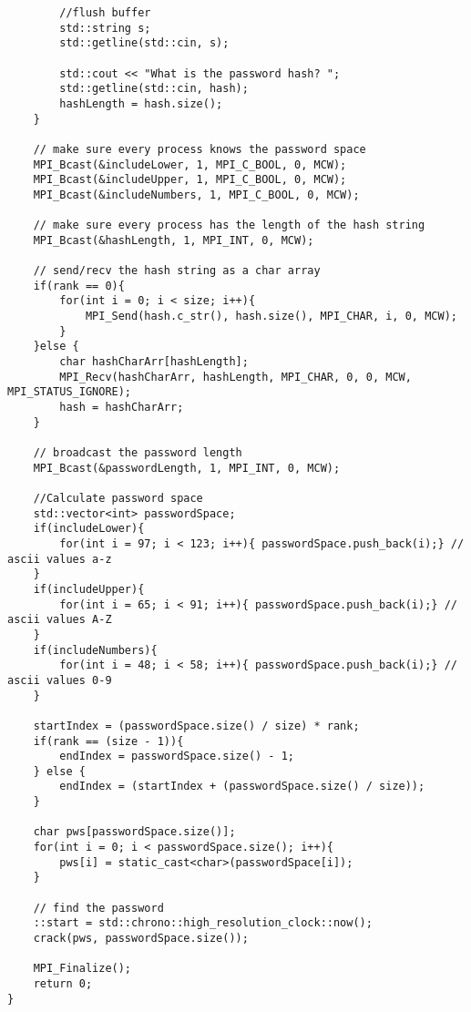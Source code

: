 \documentclass[11pt]{article}
\begin{document}
\begin{verbatim}
        //flush buffer
        std::string s;
        std::getline(std::cin, s);

		std::cout << "What is the password hash? ";
		std::getline(std::cin, hash);
		hashLength = hash.size();
	}

	// make sure every process knows the password space
    MPI_Bcast(&includeLower, 1, MPI_C_BOOL, 0, MCW);
    MPI_Bcast(&includeUpper, 1, MPI_C_BOOL, 0, MCW);
    MPI_Bcast(&includeNumbers, 1, MPI_C_BOOL, 0, MCW);

    // make sure every process has the length of the hash string
    MPI_Bcast(&hashLength, 1, MPI_INT, 0, MCW);

    // send/recv the hash string as a char array
    if(rank == 0){
        for(int i = 0; i < size; i++){
            MPI_Send(hash.c_str(), hash.size(), MPI_CHAR, i, 0, MCW);
        }
    }else {
        char hashCharArr[hashLength];
        MPI_Recv(hashCharArr, hashLength, MPI_CHAR, 0, 0, MCW, MPI_STATUS_IGNORE);
        hash = hashCharArr;
    }

    // broadcast the password length
    MPI_Bcast(&passwordLength, 1, MPI_INT, 0, MCW);

    //Calculate password space
    std::vector<int> passwordSpace;
    if(includeLower){
        for(int i = 97; i < 123; i++){ passwordSpace.push_back(i);} // ascii values a-z
    }
    if(includeUpper){
        for(int i = 65; i < 91; i++){ passwordSpace.push_back(i);} // ascii values A-Z
    }
    if(includeNumbers){
        for(int i = 48; i < 58; i++){ passwordSpace.push_back(i);} // ascii values 0-9
    }

    startIndex = (passwordSpace.size() / size) * rank;
    if(rank == (size - 1)){
        endIndex = passwordSpace.size() - 1;
    } else {
        endIndex = (startIndex + (passwordSpace.size() / size));
    }

    char pws[passwordSpace.size()];
    for(int i = 0; i < passwordSpace.size(); i++){
        pws[i] = static_cast<char>(passwordSpace[i]);
    }

    // find the password
    ::start = std::chrono::high_resolution_clock::now();
    crack(pws, passwordSpace.size());

    MPI_Finalize();
	return 0;
}

\end{verbatim}
\end{document}
